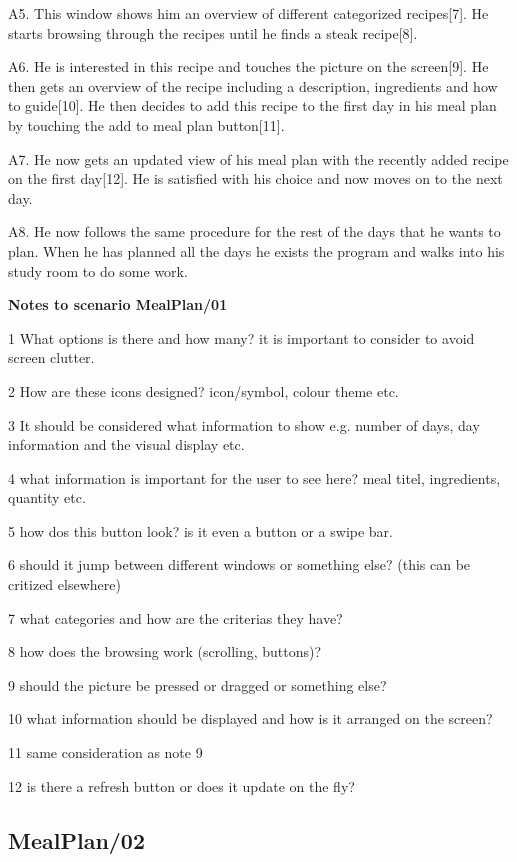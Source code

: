 	A5. This window shows him an overview of different categorized recipes[7]. He starts browsing through the recipes until he finds a steak recipe[8]. 
	
	A6. He is interested in this recipe and touches the picture on the screen[9]. He then gets an overview of the recipe including a description, ingredients and how to guide[10]. He then decides to add this recipe to the first day in his meal plan by touching the add to meal plan button[11].
	
	A7. He now gets an updated view of his meal plan with the recently added recipe on the first day[12]. He is satisfied with his choice and now moves on to the next day. 
	
	A8. He now follows the same procedure for the rest of the days that he wants to plan. When he has planned all the days he exists the program and walks into his study room to do some work.
	
\textbf{Notes to scenario MealPlan/01}

1 What options is there and how many? it is important to consider to avoid screen clutter.

2 How are these icons designed? icon/symbol, colour theme etc.

3 It should be considered what information to show e.g. number of days, day information and the visual display etc.

4 what information is important for the user to see here? meal titel, ingredients, quantity etc.

5 how dos this button look? is it even a button or a swipe bar.

6 should it jump between different windows or something else? (this can be critized elsewhere)

7 what categories and how are the criterias they have?

8 how does the browsing work (scrolling, buttons)?

9 should the picture be pressed or dragged or something else?

10 what information should be displayed and how is it arranged on the screen?

11 same consideration as note 9

12 is there a refresh button or does it update on the fly?

\subsection{MealPlan/02} \label{MealPlan02}

